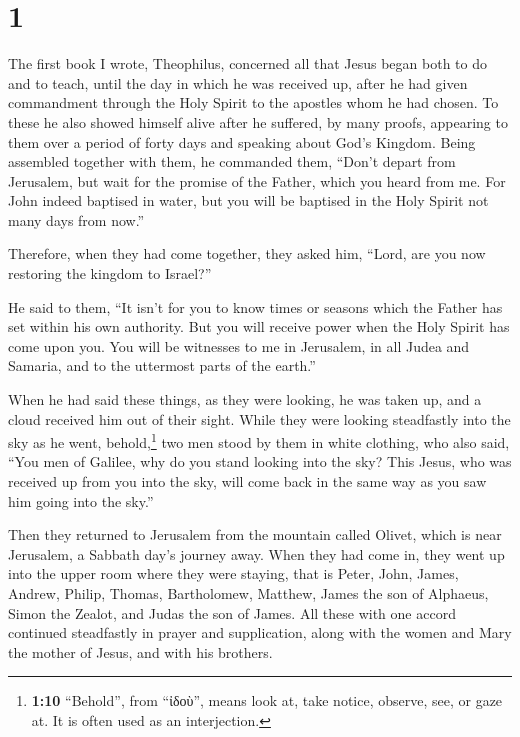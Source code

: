 \hypertarget{section}{%
\section{1}\label{section}}

 The first book I wrote, Theophilus, concerned all that
Jesus began both to do and to teach,  until the day in
which he was received up, after he had given commandment through the
Holy Spirit to the apostles whom he had chosen.  To these
he also showed himself alive after he suffered, by many proofs,
appearing to them over a period of forty days and speaking about God's
Kingdom.  Being assembled together with them, he commanded
them, ``Don't depart from Jerusalem, but wait for the promise of the
Father, which you heard from me.  For John indeed baptised
in water, but you will be baptised in the Holy Spirit not many days from
now.''

 Therefore, when they had come together, they asked him,
``Lord, are you now restoring the kingdom to Israel?''

 He said to them, ``It isn't for you to know times or
seasons which the Father has set within his own authority.
 But you will receive power when the Holy Spirit has come
upon you. You will be witnesses to me in Jerusalem, in all Judea and
Samaria, and to the uttermost parts of the earth.''

 When he had said these things, as they were looking, he
was taken up, and a cloud received him out of their sight.
 While they were looking steadfastly into the sky as he
went, behold,\footnote{\textbf{1:10} ``Behold'', from ``ἰδοὺ'', means
  look at, take notice, observe, see, or gaze at. It is often used as an
  interjection.} two men stood by them in white clothing,
 who also said, ``You men of Galilee, why do you stand
looking into the sky? This Jesus, who was received up from you into the
sky, will come back in the same way as you saw him going into the sky.''

 Then they returned to Jerusalem from the mountain called
Olivet, which is near Jerusalem, a Sabbath day's journey away.
 When they had come in, they went up into the upper room
where they were staying, that is Peter, John, James, Andrew, Philip,
Thomas, Bartholomew, Matthew, James the son of Alphaeus, Simon the
Zealot, and Judas the son of James.  All these with one
accord continued steadfastly in prayer and supplication, along with the
women and Mary the mother of Jesus, and with his brothers.

